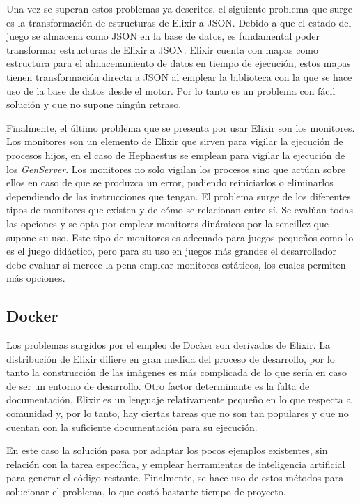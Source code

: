 Una vez se superan estos problemas ya descritos, el siguiente problema que surge es la transformación de estructuras de Elixir a JSON. Debido a que el estado del juego se almacena como JSON en la base de datos, es fundamental poder transformar estructuras de Elixir a JSON. Elixir cuenta con mapas como estructura para el almacenamiento de datos en tiempo de ejecución, estos mapas tienen transformación directa a JSON al emplear la biblioteca con la que se hace uso de la base de datos desde el motor. Por lo tanto es un problema con fácil solución y que no supone ningún retraso.

Finalmente, el último problema que se presenta por usar Elixir son los monitores. Los monitores son un elemento de Elixir que sirven para vigilar la ejecución de procesos hijos, en el caso de Hephaestus se emplean para vigilar la ejecución de los \textit{GenServer}. Los monitores no solo vigilan los procesos sino que actúan sobre ellos en caso de que se produzca un error, pudiendo reiniciarlos o eliminarlos dependiendo de las instrucciones que tengan. El problema surge de los diferentes tipos de monitores que existen y de cómo se relacionan entre sí. Se evalúan todas las opciones y se opta por emplear monitores dinámicos por la sencillez que supone su uso. Este tipo de monitores es adecuado para juegos pequeños como lo es el juego didáctico, pero para su uso en juegos más grandes el desarrollador debe evaluar si merece la pena emplear monitores estáticos, los cuales permiten más opciones.

\subsection{Docker}

Los problemas surgidos por el empleo de Docker son derivados de Elixir. La distribución de Elixir difiere en gran medida del proceso de desarrollo, por lo tanto la construcción de las imágenes es más complicada de lo que sería en caso de ser un entorno de desarrollo. Otro factor determinante es la falta de documentación, Elixir es un lenguaje relativamente pequeño en lo que respecta a comunidad y, por lo tanto, hay ciertas tareas que no son tan populares y que no cuentan con la suficiente documentación para su ejecución.

En este caso la solución pasa por adaptar los pocos ejemplos existentes, sin relación con la tarea específica, y emplear herramientas de inteligencia artificial para generar el código restante. Finalmente, se hace uso de estos métodos para solucionar el problema, lo que costó bastante tiempo de proyecto.

